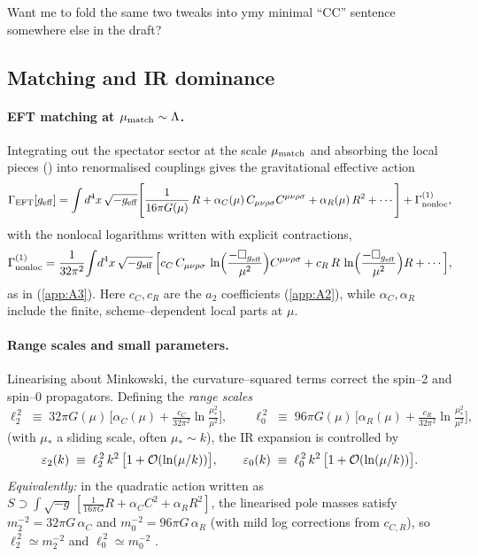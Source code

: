 \documentclass{iopjournal}
\begin{document}
Want me to fold the same two tweaks into ymy minimal ``CC'' sentence somewhere else in the draft?


\subsection{Matching and IR dominance}\label{app:A5}

\paragraph{EFT matching at $\mu_{\rm match}\sim\Lambda$.}
Integrating out the spectator sector at the scale $\mu_{\rm match}$ and absorbing the local pieces () into renormalised couplings gives the gravitational effective action
\begin{equation}
\Gamma_{\rm EFT}[g_{\rm eff}]
=\int d^4x\,\sqrt{-g_{\rm eff}}\Bigg[
\frac{1}{16\pi G(\mu)}\,R
+\alpha_C(\mu)\,C_{\mu\nu\rho\sigma}C^{\mu\nu\rho\sigma}
+\alpha_R(\mu)\,R^2
+\cdots\Bigg]
+\Gamma^{(1)}_{\rm nonloc},
\label{eq:A5_EFT}
\end{equation}
with the nonlocal logarithms written with explicit contractions,
\begin{equation}
\Gamma^{(1)}_{\rm nonloc}
=\frac{1}{32\pi^2}\!\int\! d^4x\,\sqrt{-g_{\rm eff}}\,
\Big[
c_C\,C_{\mu\nu\rho\sigma}\,\ln\!\Big(\frac{-\Box_{g_{\rm eff}}}{\mu^2}\Big)C^{\mu\nu\rho\sigma}
+c_R\,R\,\ln\!\Big(\frac{-\Box_{g_{\rm eff}}}{\mu^2}\Big)R
+\cdots\Big],
\label{eq:A5_nonloc}
\end{equation}
as in (\cref{app:A3}). Here $c_C,c_R$ are the $a_2$ coefficients (\cref{app:A2}), while $\alpha_C,\alpha_R$ include the finite, scheme–dependent local parts at $\mu$.


\paragraph{Range scales and small parameters.}
Linearising about Minkowski, the curvature–squared terms correct the spin–2 and spin–0 propagators. Defining the \emph{range scales}
\begin{equation}
\ell_2^{\,2}\;\equiv\;32\pi G(\mu)\,\Big[\alpha_C(\mu)+\tfrac{c_C}{32\pi^2}\ln\!\tfrac{\mu_*^2}{\mu^2}\Big],
\qquad
\ell_0^{\,2}\;\equiv\;96\pi G(\mu)\,\Big[\alpha_R(\mu)+\tfrac{c_R}{32\pi^2}\ln\!\tfrac{\mu_*^2}{\mu^2}\Big],
\label{eq:A5_lengths}
\end{equation}
(with $\mu_*$ a sliding scale, often $\mu_*\sim k$), the IR expansion is controlled by
\begin{equation}
\varepsilon_2(k)\;\equiv\; \ell_2^{\,2}\,k^2\,\big[1+\order{\ln(\mu/k)}\big],
\qquad
\varepsilon_0(k)\;\equiv\; \ell_0^{\,2}\,k^2\,\big[1+\order{\ln(\mu/k)}\big].
\label{eq:A5_eps}
\end{equation}
\emph{Equivalently:} in the quadratic action written as
$S\supset\int\!\sqrt{-g}\,[\frac{1}{16\pi G}R+\alpha_C C^2+\alpha_R R^2]$,
the linearised pole masses satisfy
$m_2^{-2}=32\pi G\,\alpha_C$ and $m_0^{-2}=96\pi G\,\alpha_R$
(with mild log corrections from $c_{C,R}$), so \(\ell_2^{\,2}\simeq m_2^{-2}\) and \(\ell_0^{\,2}\simeq m_0^{-2}\) \cite{Stelle1977}.
\end{document}
